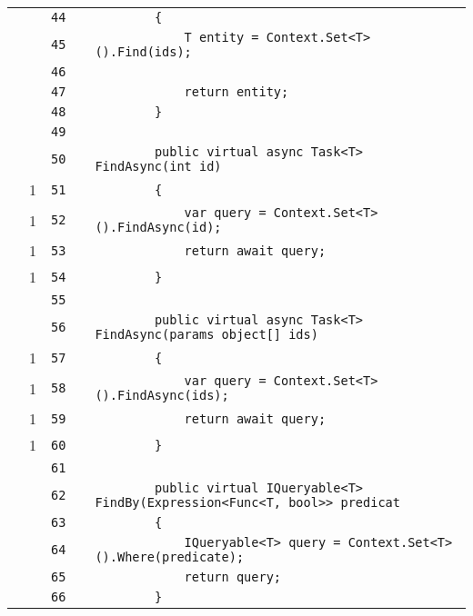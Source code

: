 \documentclass[a4paper,10pt]{article}
\begin{document}
\begin{longtable}[l]{lrrll}
\cellcolor{gray} &  & \verb~44~ & & \verb~        {~\\
\cellcolor{gray} &  & \verb~45~ & & \verb~            T entity = Context.Set<T>().Find(ids);~\\
\cellcolor{gray} &  & \verb~46~ & & \verb~~\\
\cellcolor{gray} &  & \verb~47~ & & \verb~            return entity;~\\
\cellcolor{gray} &  & \verb~48~ & & \verb~        }~\\
\cellcolor{gray} &  & \verb~49~ & & \verb~~\\
\cellcolor{gray} &  & \verb~50~ & & \verb~        public virtual async Task<T> FindAsync(int id)~\\
\cellcolor{green} & 1 & \verb~51~ & & \verb~        {~\\
\cellcolor{green} & 1 & \verb~52~ & & \verb~            var query = Context.Set<T>().FindAsync(id);~\\
\cellcolor{green} & 1 & \verb~53~ & & \verb~            return await query;~\\
\cellcolor{green} & 1 & \verb~54~ & & \verb~        }~\\
\cellcolor{gray} &  & \verb~55~ & & \verb~~\\
\cellcolor{gray} &  & \verb~56~ & & \verb~        public virtual async Task<T> FindAsync(params object[] ids)~\\
\cellcolor{green} & 1 & \verb~57~ & & \verb~        {~\\
\cellcolor{green} & 1 & \verb~58~ & & \verb~            var query = Context.Set<T>().FindAsync(ids);~\\
\cellcolor{green} & 1 & \verb~59~ & & \verb~            return await query;~\\
\cellcolor{green} & 1 & \verb~60~ & & \verb~        }~\\
\cellcolor{gray} &  & \verb~61~ & & \verb~~\\
\cellcolor{gray} &  & \verb~62~ & & \verb~        public virtual IQueryable<T> FindBy(Expression<Func<T, bool>> predicat~\\
\cellcolor{gray} &  & \verb~63~ & & \verb~        {~\\
\cellcolor{gray} &  & \verb~64~ & & \verb~            IQueryable<T> query = Context.Set<T>().Where(predicate);~\\
\cellcolor{gray} &  & \verb~65~ & & \verb~            return query;~\\
\cellcolor{gray} &  & \verb~66~ & & \verb~        }~\\

\end{longtable}
\end{document}
